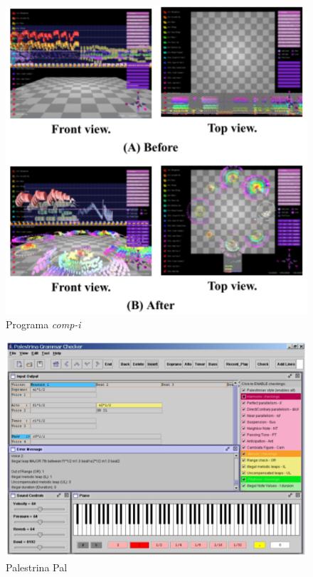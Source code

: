 \documentclass{sciposter}
\begin{document}
\begin{multicols}{2}
\begin{center}
\begin{figure}[!h]
  \centering
  \includegraphics{./figs/comp-i.pdf}
  \caption{Programa \textit{comp-i} \cite{Miyazaki2004}}
  \label{fig:label-figura}
\end{figure}

\begin{figure}[!h]
  \centering
  \includegraphics{./figs/palestrina-pal.pdf}
  \caption{Palestrina Pal \cite{Gramit2005}}
  \label{fig:label-figura}
\end{figure}

\end{center}

\end{multicols}
\end{document}
